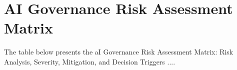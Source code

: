 \section*{AI Governance Risk Assessment Matrix}
\label{sec:app_ch5_tab_ai_governance_risk_matrix_app}
\noindent The table below presents the aI Governance Risk Assessment Matrix: Risk Analysis, Severity, Mitigation, and Decision Triggers ....

